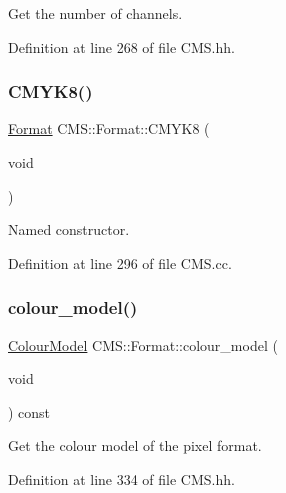 Get the number of channels. 



Definition at line 268 of file C\+M\+S.\+hh.

\mbox{\label{class_c_m_s_1_1_format_ab14bca2feccc809320606e05e7a19e94}} 
\subsubsection{\texorpdfstring{C\+M\+Y\+K8()}{CMYK8()}}
{\footnotesize\ttfamily \hyperlink{class_c_m_s_1_1_format}{Format} C\+M\+S\+::\+Format\+::\+C\+M\+Y\+K8 (\begin{DoxyParamCaption}\item[{void}]{ }\end{DoxyParamCaption})\hspace{0.3cm}{\ttfamily [static]}}



Named constructor. 



Definition at line 296 of file C\+M\+S.\+cc.

\mbox{\label{class_c_m_s_1_1_format_a74fddbb27e7cf4046af0326f6a886f83}} 
\subsubsection{\texorpdfstring{colour\+\_\+model()}{colour\_model()}}
{\footnotesize\ttfamily \hyperlink{namespace_c_m_s_a9cb18b5da51a22c3c9dd25a5c9048e42}{Colour\+Model} C\+M\+S\+::\+Format\+::colour\+\_\+model (\begin{DoxyParamCaption}\item[{void}]{ }\end{DoxyParamCaption}) const\hspace{0.3cm}{\ttfamily [inline]}}



Get the colour model of the pixel format. 



Definition at line 334 of file C\+M\+S.\+hh.

\mbox{\label{class_c_m_s_1_1_format_acd22c5e9c4a61b954b98fced0d7d1874}} 
